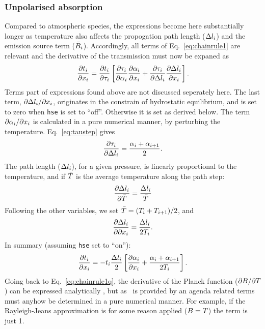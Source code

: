 \subsubsection{Unpolarised absorption}
%
Compared to atmospheric species, the expressions become here substantially
longer as temperature also affects the propogation path length ($\Delta
l_{i}$) and the emission source term ($\bar{B}_i$). Accordingly,
all terms of Eq.~\ref{eq:chainrule1} are relevant and the derivative of the
transmission must now be expaned as
\begin{equation}
  \frac{\partial t_{i}}{\partial x_{i}} =
    \frac{\partial t_{i}}{\partial\tau_{i}}
    \left[
      \frac{\partial\tau_{i}}{\partial{\alpha}_{i}}
      \frac{\partial{\alpha}_{i}}{\partial x_{i}} + 
      \frac{\partial\tau_{i}}{\partial\Delta l_{i}}
     \frac{\partial\Delta l_{i}}{\partial x_{i}}
    \right].
\end{equation}
Terms part of expressions found above are not discussed seperately here. The
last term, $\partial\Delta l_{i}/\partial x_{i}$, originates in the
constrain of hydrostatic equilibrium, and is set to zero when \verb|hse| 
is set to ``off''. Otherwise it is set as derived below.
The term $\partial{\alpha}_{i}/\partial x_{i}$ is calculated in a pure
numerical manner, by perturbing the temperature. Eq.~\ref{eq:taustep} gives
\begin{equation}
  \frac{\partial \tau_{i}}{\partial \Delta l_{i}} = 
  \frac{{\alpha}_{i}+{\alpha}_{i+1}}{2}. 
\end{equation}
The path length ($\Delta l_{i}$), for a given pressure, is linearly
proportional to the temperature, and if $\bar{T}$ is the average temperature
along the path step:
\begin{equation}
  \frac{\partial \Delta l_{i}}{\partial \bar{T}} =   
                                    \frac{\Delta l_{i}}{\bar{T}} 
\end{equation}
Following the other variables, we set $\bar{T}=(T_{i}+T_{i+1})/2$, and
\begin{equation}
  \frac{\partial \Delta l_{i}}{\partial \partial x_{i}} = 
                                    \frac{\Delta l_{i}}{2T_{i}}.
\end{equation}
In summary (assuming \verb|hse| set to ``on''):
\begin{equation}
  \frac{\partial t_{i}}{\partial x_{i}} = -t_{i}
    \frac{\Delta l_{i}}{2}
    \left[
      \frac{\partial{\alpha}_{i}}{\partial x_{i}} + 
      \frac{{\alpha}_{i}+{\alpha}_{i+1}}{2T_{i}}
    \right].  
\end{equation}
Going back to Eq.~\ref{eq:chainrule1q}, the derivative of the Planck function
($\partial B/\partial T$) can be expressed analytically
\citep{eriksson:studi:02}, but as \Planck\ is provided by an agenda related
terms must anyhow be determined in a pure numerical manner. For example, if the
Rayleigh-Jeans approximation is for some reason applied ($B=T$) the
term is just 1.

